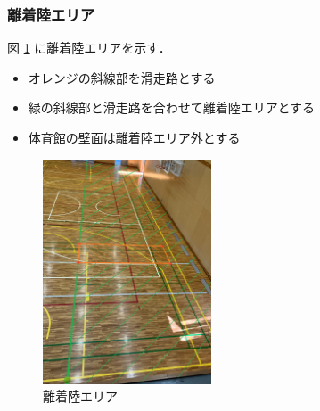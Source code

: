 \subsubsection{離着陸エリア}
図 \ref{fig::plane::landingZone} に離着陸エリアを示す．
\begin{itemize}
  \item オレンジの斜線部を滑走路とする
  \item 緑の斜線部と滑走路を合わせて離着陸エリアとする
  \item 体育館の壁面は離着陸エリア外とする
\end{itemize}
\begin{figure}[htb]
  \centering\includegraphics[width = 50mm,angle=90]{./plane_landingZone.jpg}
  \caption{離着陸エリア}
  \label{fig::plane::landingZone}
\end{figure}
\newpage
